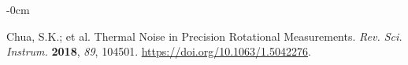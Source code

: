\documentclass[entropy,article,submit,pdftex,moreauthors]{Definitions/mdpi}
\begin{document}
\begin{adjustwidth}{-\extralength}{0cm}
{\begin{thebibliography}{999}
Chua, S.K.; et al. Thermal Noise in Precision Rotational Measurements. {\em Rev. Sci. Instrum.} {\bf 2018}, {\em 89}, 104501. \url{https://doi.org/10.1063/1.5042276}.


\end{thebibliography}
}



%


\PublishersNote{}
\end{adjustwidth}
\end{document}
